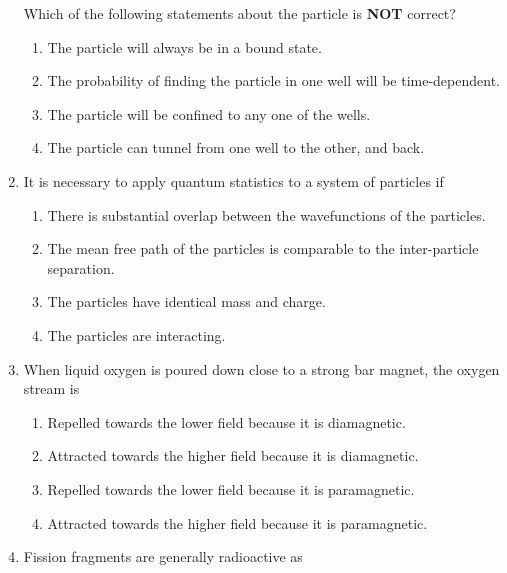 \documentclass[journal,13pt,onecolumn]{IEEEtran}
\begin{document}
\begin{enumerate}[itemsep = 1em]
Which of the following statements about the particle is \textbf{NOT} correct?

\hfill{}

\begin{enumerate}
    \item The particle will always be in a bound state.
    \item The probability of finding the particle in one well will be time-dependent.
    \item The particle will be confined to any one of the wells.
    \item The particle can tunnel from one well to the other, and back.
\end{enumerate}



\item It is necessary to apply quantum statistics to a system of particles if

\hfill{}

\begin{enumerate}
    \item There is substantial overlap between the wavefunctions of the particles.
    \item The mean free path of the particles is comparable to the inter-particle separation.
    \item The particles have identical mass and charge.
    \item The particles are interacting.
\end{enumerate}


\item When liquid oxygen is poured down close to a strong bar magnet, the oxygen stream is

\hfill{}

\begin{enumerate}
    \item Repelled towards the lower field because it is diamagnetic.
    \item Attracted towards the higher field because it is diamagnetic.
    \item Repelled towards the lower field because it is paramagnetic.
    \item Attracted towards the higher field because it is paramagnetic.
\end{enumerate}


\item Fission fragments are generally radioactive as


\end{enumerate}
\end{document}
